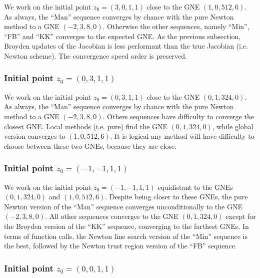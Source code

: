 \documentclass[11pt]{article}
\begin{document}
We work on the initial point $z_0 = (3, 0,  1,  1)$ close to the GNE $(1, 0, 512, 6)$. As always, the ``Man'' sequence converges by chance with the pure Newton method to a GNE $(-2, 3, 8, 0)$. Otherwise the other sequences, namely ``Min'', ``FB'' and ``KK'' converges to the expected GNE. As the previous subsection, Broyden updates of the Jacobian is less performant than the true Jacobian (i.e. Newton scheme). The convergence speed order is preserved.






\subsubsection{Initial point $z_0 = (0, 3, 1, 1)$}

We work on the initial point $z_0 = (0, 3, 1,  1)$ close to the GNE $(0, 1, 324, 0)$. As always, the ``Man'' sequence converges by chance with the pure Newton method to a GNE $(-2, 3, 8, 0)$. Others sequences have difficulty to converge the closest GNE. Local methods (i.e. pure) find the GNE $(0, 1, 324, 0)$, while global version converges to $(1, 0, 512, 6)$. It is logical any method will have difficulty to choose between these two GNEs, because they are close. 



\subsubsection{Initial point $z_0 = (-1, -1, 1,  1)$}

We work on the initial point $z_0 = (-1, -1, 1,  1)$ equidistant to the GNEs $(0, 1, 324, 0)$ and $(1, 0, 512, 6)$. Despite being closer to these GNEs, the pure Newton version of the ``Man'' sequence converges unconditionally to the GNE $(-2, 3, 8, 0)$. All other sequences converges to the GNE $(0, 1, 324, 0)$  except for the Broyden version of the ``KK'' sequence, converging to the farthest GNEs. In terms of function calls, the Newton line search version of the ``Min'' sequence is the best, followed by the Newton trust region version of the ``FB'' sequence.



\subsubsection{Initial point $z_0 = (0, 0, 1,  1)$}
\end{document}
